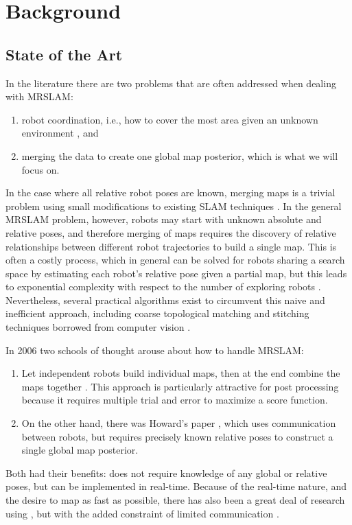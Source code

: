 \section{Background}
\label{S:Back}

\subsection{State of the Art}
\label{SS:Back:SOA}
    
In the literature there are two problems that are often addressed when dealing with MRSLAM:
\begin{enumerate}
\item robot coordination, i.e., how to cover the most area given an unknown environment \cite{julia2012comparison}, and
\item merging the data to create one global map posterior, which is what we will focus on.
\end{enumerate}

In the case where all relative robot poses are known, merging maps is a trivial problem using small modifications to existing SLAM techniques \cite{thrun2001probabilistic}. In the general MRSLAM problem, however, robots may start with unknown absolute and relative poses, and therefore merging of maps requires the discovery of relative relationships between different robot trajectories to build a single map. This is often a costly process, which in general can be solved for robots sharing a search space by estimating each robot's relative pose given a partial map, but this leads to exponential complexity with respect to the number of exploring robots \cite{fox2006distributed}. Nevertheless, several practical algorithms exist to circumvent this naive and inefficient approach,  including coarse topological matching and stitching techniques borrowed from computer vision \cite{birk2006merging}.

In 2006 two schools of thought arouse about how to handle MRSLAM:
\begin{enumerate}
\item Let independent robots build individual maps, then at the end combine the maps together \cite{birk2006merging}.  This approach is particularly attractive for post processing because it requires multiple trial and error to maximize a score function. 
\item On the other hand, there was Howard's paper \cite{howard2006multi}, which uses communication between robots, but requires precisely known relative poses to construct a single global map posterior.
\end{enumerate}
Both had their benefits: \cite{birk2006merging} does not require knowledge of any global or relative poses, but \cite{howard2006multi} can be implemented in real-time.  Because of the real-time nature, and the desire to map as fast as possible, there has also been a great deal of research using \cite{howard2006multi}, but with the added constraint of limited communication \cite{lazaro2013multi}.

